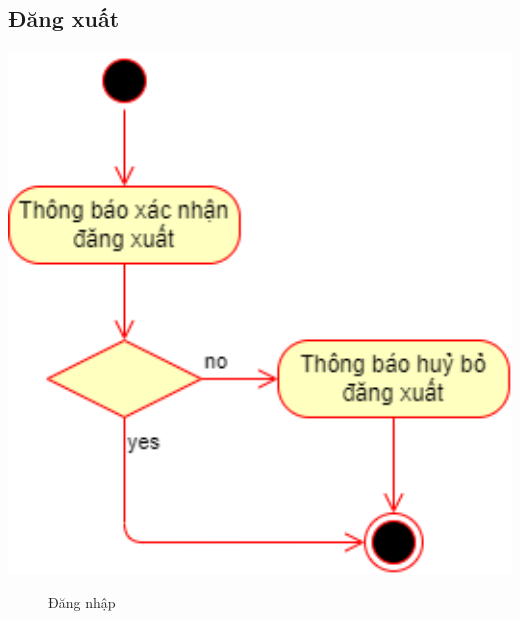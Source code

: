 \subsection{Đăng xuất}
  \begin{center}
    \includegraphics[width=1.1\textwidth]{image/activity/logout.png}
    \begin{figure}
      \centering
      \caption{Đăng nhập}
    \end{figure}
  \end{center}

